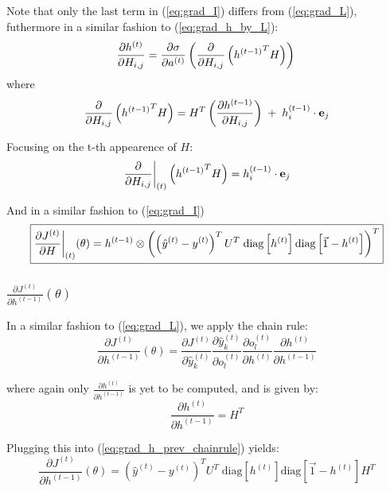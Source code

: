 Note that only the last term in (\ref{eq:grad_I}) differs from (\ref{eq:grad_L}), futhermore in a similar fashion to (\ref{eq:grad_h_by_L}):
\begin{equation} \label{eq:grad_h_by_H}
  \frac{\partial h^{(t)}}{\partial H_{i,j}} = \frac{\partial \sigma}{\partial a^{(t)}} \left(  \frac{\partial }{\partial H_{i,j}} \left( {h^{(t-1)}}^T H \right) \right) \\
\end{equation}
where 
\begin{equation}
  \frac{\partial }{\partial H_{i,j}} \left( {h^{(t-1)}}^T H \right) = H^T \left( \frac{\partial h^{(t-1)}}{\partial H_{i,j}} \right) \;+\; h^{(t-1)}_i \cdot \textbf{\text{e}}_j
\end{equation}

Focusing on the t-th appearence of $H$:
\begin{equation}
  \restr{\frac{\partial }{\partial H_{i,j}}}{(t)}\left( {h^{(t-1)}}^T H \right) = h^{(t-1)}_i \cdot \textbf{\text{e}}_j
\end{equation}

And in a similar fashion to (\ref{eq:grad_I})
\begin{equation} \label{eq:grad_H}
  \boxed{ \restr{\frac{\partial J^{(t)}}{\partial H}}{(t)}(\theta) = h^{(t-1)} \otimes \left(\left(\hat{y}^{(t)} - y^{(t)}\right)^T U^T \; \text{diag}\left[ h^{(t)} \right]  \text{diag}\left[ \vec{1} - h^{(t)} \right] \right)^T }
\end{equation}



\subsubsection[short]{$ \frac{\partial J^{(t)}}{\partial h^{(t-1)}}(\theta) $}

In a similar fashion to (\ref{eq:grad_L}), we apply the chain rule:
\begin{equation} \label{eq:grad_h_prev_chainrule}
  \frac{\partial J^{(t)}}{\partial h^{(t-1)}}(\theta) = \frac{\partial J^{(t)}}{\partial \hat{y}_k^{(t)}} \frac{{\partial \hat{y}_k^{(t)}}}{\partial o_l^{(t)}} \frac{\partial o_l^{(t)}}{\partial h^{(t)}} \frac{\partial h^{(t)}}{\partial h^{(t-1)}} 
\end{equation}

where again only $\frac{\partial h^{(t)}}{\partial h^{(t-1)}}$ is yet to be computed, and is given by:
\begin{equation} 
  \frac{\partial h^{(t)}}{\partial h^{(t-1)}} = H^T
\end{equation}

Plugging this into (\ref{eq:grad_h_prev_chainrule}) yields:
\begin{equation} \label{eq:grad_h_prev}
  \boxed{ \frac{\partial J^{(t)}}{\partial h^{(t-1)}}(\theta) = \left(\hat{y}^{(t)} - y^{(t)}\right)^T U^T \; \text{diag}\left[ h^{(t)} \right]  \text{diag}\left[ \vec{1} - h^{(t)} \right] H^T }
\end{equation}
